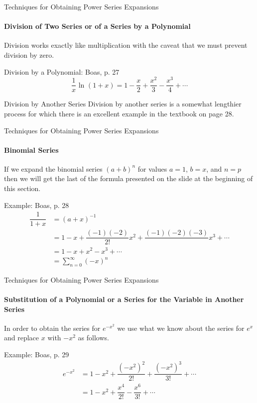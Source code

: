 \documentclass{beamer}
\begin{document}
\begin{frame}{Techniques for Obtaining Power Series Expansions}
    	\framesubtitle{Division of Two Series or of a Series by a Polynomial}
	Division works exactly like multiplication with the caveat that we must prevent division by zero.
    	\begin{exampleblock}{Division by a Polynomial: Boas, p. 27}
	\[ \dfrac{1}{x}\mbox{~ln\ }(1+x) = 1 - \dfrac{x}{2} + \dfrac{x^{2}}{3} - \dfrac{x^{3}}{4} + \cdots \]
	\end{exampleblock}
	\begin{block}{Division by Another Series}
    	Division by another series is a somewhat lengthier process for which there is an excellent example in the textbook on page 28.
	\end{block}
\end{frame}
  
\begin{frame}{Techniques for Obtaining Power Series Expansions}
    	\framesubtitle{Binomial Series}
	If we expand the binomial series $(a+b)^{n}$ for values $a=1$, $b=x$, and $n=p$ then we will get the last of the formula presented on the slide at the beginning of this section.
	\begin{exampleblock}{Example: Boas, p. 28}
	\begin{align*}
	\dfrac{1}{1+x} &= (a+x)^{-1} \\
	&= 1-x+\dfrac{(-1)(-2)}{2!}x^{2}+\dfrac{(-1)(-2)(-3)}{}x^{3}+\cdots \\
	&= 1-x+x^{2}-x^{3}+\cdots \\
	&= \sum\limits_{n=0}^{\infty}(-x)^{n}
	\end{align*}
	\end{exampleblock}
\end{frame}
  
\begin{frame}{Techniques for Obtaining Power Series Expansions}
    	\framesubtitle{Substitution of a Polynomial or a Series for the Variable in Another Series}
	In order to obtain the series for $e^{-x^{2}}$ we use what we know about the series for $e^{x}$ and replace $x$ with $-x^{2}$ as follows.
	\begin{exampleblock}{Example: Boas, p. 29}
	\begin{align*}
	e^{-x^{2}} &= 1-x^{2}+\dfrac{(-x^{2})^{2}}{2!}+\dfrac{(-x^{2})^{3}}{3!}+\cdots \\
	&= 1-x^{2}+\dfrac{x^{4}}{2!}-\dfrac{x^{6}}{3!}+\cdots
	\end{align*}
	\end{exampleblock}
\end{frame}
  
\end{document}

